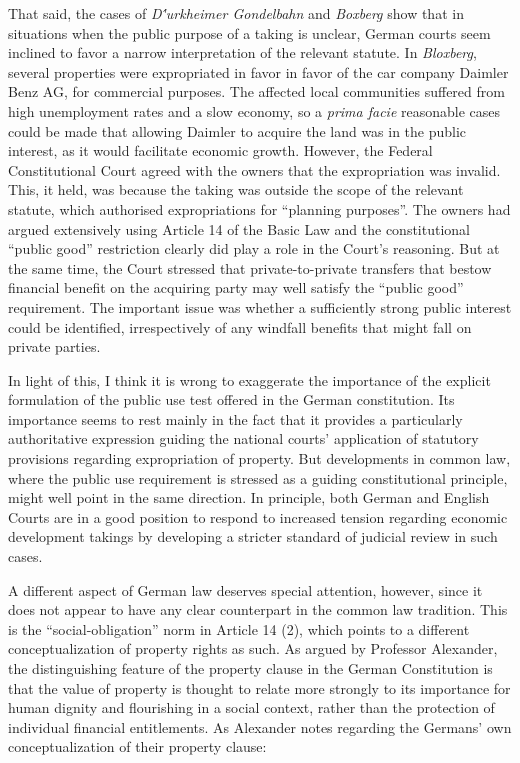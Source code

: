 That said, the cases of {\it D{\''u}rkheimer Gondelbahn} and {\it Boxberg} show that in situations when the public purpose of a taking is unclear, German courts seem inclined to favor a narrow interpretation of the relevant statute. In {\it Bloxberg}, several properties were expropriated in favor in favor of the car company Daimler Benz AG, for commercial purposes. The affected local communities suffered from high unemployment rates and a slow economy, so a {\it prima facie} reasonable cases could be made that allowing Daimler to acquire the land was in the public interest, as it would facilitate economic growth. However, the Federal Constitutional Court agreed with the owners that the expropriation was invalid. This, it held, was because the taking was outside the scope of the relevant statute, which authorised expropriations for ``planning purposes''. The owners had argued extensively using Article 14 of the Basic Law and the constitutional ``public good'' restriction clearly did play a role in the Court's reasoning. But at the same time, the Court stressed that private-to-private transfers that bestow financial benefit on the acquiring party may well satisfy the ``public good'' requirement. The important issue was whether a sufficiently strong public interest could be identified, irrespectively of any windfall benefits that might fall on private parties.

In light of this, I think it is wrong to exaggerate the importance of the explicit formulation of the public use test offered in the German constitution. Its importance seems to rest mainly in the fact that it provides a particularly authoritative expression guiding the national courts' application of statutory provisions regarding expropriation of property. But developments in common law, where the public use requirement is stressed as a guiding constitutional principle, might well point in the same direction. In principle, both German and English Courts are in a good position to respond to increased tension regarding economic development takings by developing a stricter standard of judicial review in such cases.

A different aspect of German law deserves special attention, however, since it does not appear to have any clear counterpart in the common law tradition. This is the  ``social-obligation'' norm in Article 14 (2), which points to a different conceptualization of property rights as such. As argued by Professor Alexander, the distinguishing feature of the property clause in the German Constitution is that the value of property is thought to relate more strongly to its importance for human dignity and flourishing in a social context, rather than the protection of individual financial entitlements. As Alexander notes regarding the Germans' own conceptualization of their property clause:


